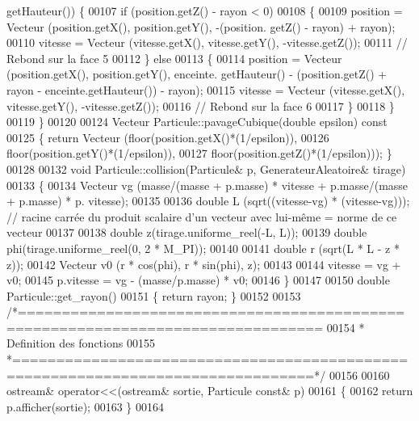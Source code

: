 \begin{DoxyCode}
      getHauteur()) \{
00107         \textcolor{keywordflow}{if} (position.getZ() - rayon < 0)
00108         \{
00109             position = Vecteur (position.getX(), position.getY(), -(position.
      getZ() - rayon) + rayon);
00110             vitesse = Vecteur (vitesse.getX(), vitesse.getY(), -vitesse.getZ());
00111             \textcolor{comment}{// Rebond sur la face 5}
00112         \} \textcolor{keywordflow}{else}
00113         \{
00114             position = Vecteur (position.getX(), position.getY(), enceinte.
      getHauteur() - (position.getZ() + rayon - enceinte.getHauteur()) - rayon);
00115             vitesse = Vecteur (vitesse.getX(), vitesse.getY(), -vitesse.getZ());
00116             \textcolor{comment}{// Rebond sur la face 6}
00117         \}
00118     \}
00119 \}
00120 
00124 Vecteur Particule::pavageCubique(\textcolor{keywordtype}{double} epsilon)\textcolor{keyword}{ const}
00125 \textcolor{keyword}{}\{ \textcolor{keywordflow}{return} Vecteur (floor(position.getX()*(1/epsilon)),
00126                   floor(position.getY()*(1/epsilon)),
00127                   floor(position.getZ()*(1/epsilon))); \}
00128 
00132 \textcolor{keywordtype}{void} Particule::collision(Particule& p, GenerateurAleatoire& tirage)
00133 \{
00134     Vecteur vg (masse/(masse + p.masse) * vitesse + p.masse/(masse + p.masse) * p.
      vitesse);
00135     
00136     \textcolor{keywordtype}{double} L (sqrt((vitesse-vg) * (vitesse-vg))); \textcolor{comment}{// racine carrée du produit scalaire d'un vecteur avec
       lui-même = norme de ce vecteur}
00137     
00138     \textcolor{keywordtype}{double} z(tirage.uniforme_reel(-L, L));
00139     \textcolor{keywordtype}{double} phi(tirage.uniforme_reel(0, 2 * M\_PI));
00140     
00141     \textcolor{keywordtype}{double} r (sqrt(L * L - z * z));
00142     Vecteur v0 (r * cos(phi), r * sin(phi), z);
00143     
00144     vitesse = vg + v0;
00145     p.vitesse = vg - (masse/p.masse) * v0;
00146 \}
00147 
00150 \textcolor{keywordtype}{double} Particule::get_rayon() 
00151 \{ \textcolor{keywordflow}{return} rayon; \}
00152 
00153 \textcolor{comment}{/*================================================================================}
00154 \textcolor{comment}{ * Definition des fonctions}
00155 \textcolor{comment}{ *================================================================================*/}
00156 
00160 ostream& operator<<(ostream& sortie, Particule \textcolor{keyword}{const}& p)
00161 \{
00162     \textcolor{keywordflow}{return} p.afficher(sortie);
00163 \}
00164 
\end{DoxyCode}
